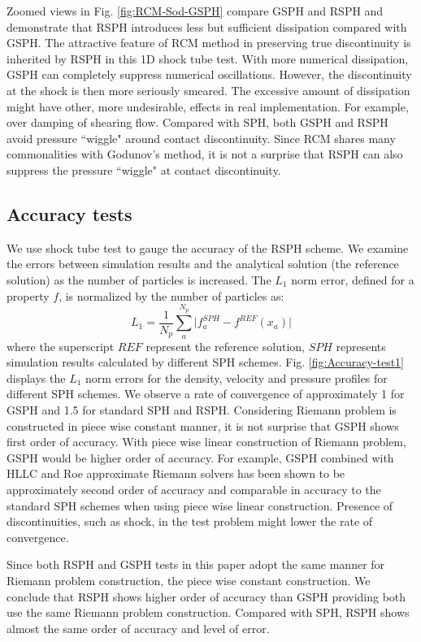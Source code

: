 \documentclass[review]{elsarticle}
\begin{document}
Zoomed views in Fig. \ref{fig:RCM-Sod-GSPH} compare GSPH and RSPH and demonstrate that RSPH introduces less but sufficient dissipation compared with GSPH. The attractive feature of RCM method in preserving true discontinuity is inherited by RSPH in this 1D shock tube test. With more numerical dissipation, GSPH can completely suppress numerical oscillations. However, the discontinuity at the shock is then more seriously smeared. The excessive amount of dissipation might have other, more undesirable, effects in real implementation. For example, over damping of shearing flow. Compared with SPH, both GSPH and RSPH avoid pressure ``wiggle" around contact discontinuity. Since RCM shares many commonalities with Godunov's method, it is not a surprise that RSPH can also suppress the pressure ``wiggle" at contact discontinuity.

\subsection{Accuracy tests}
We use shock tube test to gauge the accuracy of the RSPH scheme.
We examine the errors between simulation results and the analytical solution (the reference solution) as the number of particles is increased. The $L_1$ norm error, defined for a property $f$, is normalized by the number of particles as:
\begin{equation}
L_1= \frac{1}{N_p} \sum_a^{N_p} \vert f_a^{SPH} - f^{REF} (x_a) \vert 
\end{equation}
where the superscript $REF$ represent the reference solution, $SPH$ represents simulation results calculated by different SPH schemes. Fig. \ref{fig:Accuracy-test1} displays the $L_1$ norm errors for the density, velocity and pressure profiles for different SPH schemes.
We observe a rate of convergence of approximately 1 for GSPH and 1.5 for standard SPH and RSPH.  Considering Riemann problem is constructed in piece wise constant manner, it is not surprise that GSPH shows first order of accuracy. With piece wise linear construction of Riemann problem, GSPH would be higher order of accuracy. For example,
GSPH combined with HLLC and Roe approximate Riemann solvers has been shown to be approximately second order of accuracy \citep{puri2014comparison} and comparable in accuracy to the standard SPH schemes when using piece wise linear construction. Presence of discontinuities, such as shock, in the test problem might lower the rate of convergence. 

Since both RSPH and GSPH tests in this paper adopt the same manner for Riemann problem construction, the piece wise constant construction. We conclude that RSPH shows higher order of accuracy than GSPH providing both use the same Riemann problem construction. Compared with SPH, RSPH shows almost the same order of accuracy and level of error.
 
\end{document}
